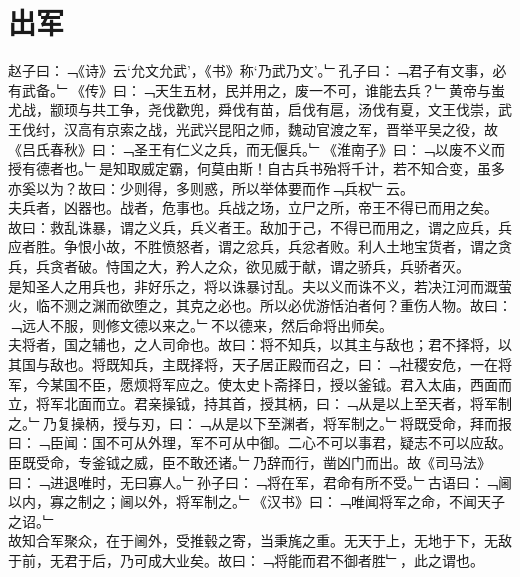 \chapter{出军}%
赵子曰：﹁《诗》云‘允文允武’，《书》称‘乃武乃文’。﹂孔子曰：﹁君子有文事，必有武备。﹂《传》曰：﹁天生五材，民并用之，废一不可，谁能去兵？﹂黄帝与蚩尤战，颛顼与共工争，尧伐歡兜，舜伐有苗，启伐有扈，汤伐有夏，文王伐崇，武王伐纣，汉高有京索之战，光武兴昆阳之师，魏动官渡之军，晋举平吴之役，故《吕氏春秋》曰：﹁圣王有仁义之兵，而无偃兵。﹂《淮南子》曰：﹁以废不义而授有德者也。﹂是知取威定霸，何莫由斯！自古兵书殆将千计，若不知合变，虽多亦奚以为？故曰：少则得，多则惑，所以举体要而作﹁兵权﹂云。\\
夫兵者，凶器也。战者，危事也。兵战之场，立尸之所，帝王不得已而用之矣。\\
故曰：救乱诛暴，谓之义兵，兵义者王。敌加于己，不得已而用之，谓之应兵，兵应者胜。争恨小故，不胜愤怒者，谓之忿兵，兵忿者败。利人土地宝货者，谓之贪兵，兵贪者破。恃国之大，矜人之众，欲见威于献，谓之骄兵，兵骄者灭。
\\
是知圣人之用兵也，非好乐之，将以诛暴讨乱。夫以义而诛不义，若决江河而溉萤火，临不测之渊而欲堕之，其克之必也。所以必优游恬泊者何？重伤人物。故曰：﹁远人不服，则修文德以来之。﹂不以德来，然后命将出师矣。\\
夫将者，国之辅也，之人司命也。故曰：将不知兵，以其主与敌也；君不择将，以其国与敌也。将既知兵，主既择将，天子居正殿而召之，曰：﹁社稷安危，一在将军，今某国不臣，愿烦将军应之。使太史卜斋择日，授以釜钺。君入太庙，西面而立，将军北面而立。君亲操钺，持其首，授其柄，曰：﹁从是以上至天者，将军制之。﹂乃复操柄，授与刃，曰：﹁从是以下至渊者，将军制之。﹂将既受命，拜而报曰：﹁臣闻：国不可从外理，军不可从中御。二心不可以事君，疑志不可以应敌。臣既受命，专釜钺之威，臣不敢还诸。﹂乃辞而行，凿凶门而出。故《司马法》曰：﹁进退唯时，无曰寡人。﹂孙子曰：﹁将在军，君命有所不受。﹂古语曰：﹁阃以内，寡之制之；阃以外，将军制之。﹂《汉书》曰：﹁唯闻将军之命，不闻天子之诏。﹂\\
故知合军聚众，在于阃外，受推毂之寄，当秉旄之重。无天于上，无地于下，无敌于前，无君于后，乃可成大业矣。故曰：﹁将能而君不御者胜﹂，此之谓也。
%
%
